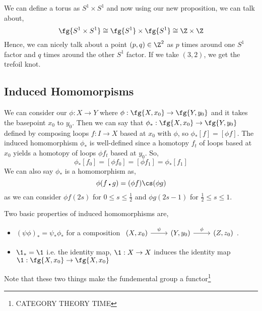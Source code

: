 \begin{eg}[Torus]
  We can define a torus as $S^1 \times S^1$ and now using our new proposition, we can talk about,
  $$ \fg {S^1 \times S^1} \cong \fg {S^1} \times \fg {S^1} \cong \Z \times \Z  $$
  Hence, we can nicely talk about a point $(p, q) \in \Z^2$ as $p$ times around one $S^1$ factor and $q$ times around the other $S^1$ factor. If we take $(3, 2)$, we get the trefoil knot.
  \begin{figure}[!ht]
  \centering
  \end{figure}
\end{eg}

\subsection{Induced Homomorpisms}
We can consider our $\phi : X \to Y$ where $\phi : \fg {X, x_0} \to \fg {Y, y_0}$ and it takes the basepoint $x_0$ to $y_0$. Then we can say that $\phi_{*} : \fg{X, x_0} \to \fg{Y, y_0}$ defined by composing loops $f : I \to X$ based at $x_0$ with $\phi$, so $\phi_{*}[f] = [\phi f]$. The induced homomorphism $\phi_{*}$ is well-defined since a homotopy $f_t$ of loops based at $x_0$ yields a homotopy of loops $\phi f_t$ based at $y_0$. So,
$$ \phi_{*}[f_0] = [\phi f_0] = [\phi f_1] = \phi_{*}[f_1] $$
We can also say $\phi_{*}$ is a homomorphism as,
$$ \phi (f \centerdot g) = (\phi f) \cs (\phi g) $$
as we can consider $\phi f(2s)$ for $0 \le s \le \frac{1}{2}$ and $\phi g (2s - 1)$ for $\frac{1}{2} \le s \le 1$.
\begin{ndefi}
  Two basic properties of induced homomorphisms are,
  \begin{itemize}
    \item $(\psi \phi)_{*} = \psi_* \phi_*$ for a composition $\begin{tikzcd}
    	{(X, x_0)} & {(Y, y_0)} & {(Z, z_0)}
    	\arrow["\psi", from=1-1, to=1-2]
    	\arrow["\phi", from=1-2, to=1-3]
    \end{tikzcd}$.
    \item $\1_* = \1$ i.e. the identity map, $\1 : X \to X$ induces the identity map $\1 : \fg {X, x_0} \to \fg {X, x_0}$
  \end{itemize}
  Note that these two things make the fundemental group a functor\footnote{CATEGORY THEORY TIME}
\end{ndefi}

